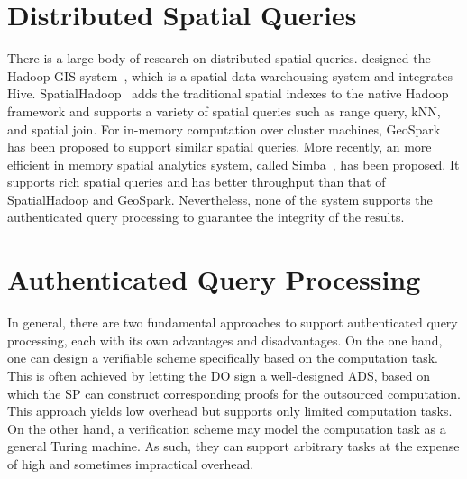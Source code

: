 \section{Distributed Spatial Queries}

There is a large body of research on distributed spatial queries. \citeauthor{10.14778/2536222.2536227} designed the Hadoop-GIS system~\cite{10.14778/2536222.2536227}, which is a spatial data warehousing system and integrates Hive. SpatialHadoop~\cite{10.1109/icde.2015.7113382} adds the traditional spatial indexes to the native Hadoop framework and supports a variety of spatial queries such as range query, kNN, and spatial join. For in-memory computation over cluster machines, GeoSpark~\cite{10.1145/2820783.2820860} has been proposed to support similar spatial queries. More recently, an more efficient in memory spatial analytics system, called Simba~\cite{10.1145/2882903.2915237}, has been proposed. It supports rich spatial queries and has better throughput than that of SpatialHadoop and GeoSpark. Nevertheless, none of the system supports the authenticated query processing to guarantee the integrity of the results.

\section{Authenticated Query Processing}

In general, there are two fundamental approaches to support authenticated query processing, each with its own advantages and disadvantages. On the one hand, one can design a verifiable scheme specifically based on the computation task. This is often achieved by letting the DO sign a well-designed ADS, based on which the SP can construct corresponding proofs for the outsourced computation. This approach yields low overhead but supports only limited computation tasks. On the other hand, a verification scheme may model the computation task as a general Turing machine. As such, they can support arbitrary tasks at the expense of high and sometimes impractical overhead.

